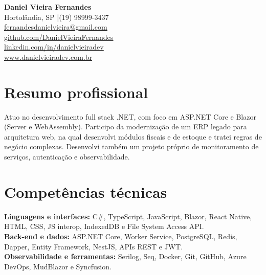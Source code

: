 \documentclass[11pt,a4paper]{article}
\newcommand{\cvlink}[2]{\href{#1}{\underline{#2}}}
\begin{document}
\begin{center}
  {\Large\bfseries Daniel Vieira Fernandes}\\[4pt]
  Hortolândia, SP \quad|\quad (19) 98999-3437\\[8pt]
  \cvlink{mailto:fernandesdanielvieira@gmail.com}{\faEnvelope\enspace fernandesdanielvieira@gmail.com}\\[8pt]
  \cvlink{https://github.com/DanielVieiraFernandes}{\faGithub\enspace github.com/DanielVieiraFernandes}\\[8pt]
  \cvlink{https://www.linkedin.com/in/danielvieiradev/}{\faLinkedin\enspace linkedin.com/in/danielvieiradev}\\[8pt]
  \cvlink{https://www.danielvieiradev.com.br/}{\faGlobe\enspace www.danielvieiradev.com.br}
\end{center}

\section*{Resumo profissional}
Atuo no desenvolvimento full stack .NET, com foco em ASP.NET Core e Blazor (Server e WebAssembly). Participo da modernização de um ERP legado para arquitetura web, na qual desenvolvi módulos fiscais e de estoque e tratei regras de negócio complexas. Desenvolvi também um projeto próprio de monitoramento de serviços, autenticação e observabilidade.

\section*{Competências técnicas}
\textbf{Linguagens e interfaces:} C\#, TypeScript, JavaScript, Blazor, React Native, HTML, CSS, JS interop, IndexedDB e File System Access API.\\
\textbf{Back-end e dados:} ASP.NET Core, Worker Service, PostgreSQL, Redis, Dapper, Entity Framework, NestJS, APIs REST e JWT.\\
\textbf{Observabilidade e ferramentas:} Serilog, Seq, Docker, Git, GitHub, Azure DevOps, MudBlazor e Syncfusion.
\end{document}

